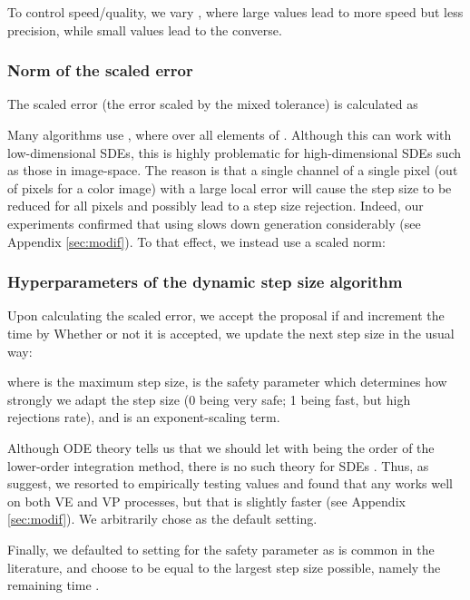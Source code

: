 \documentclass{article}
\begin{document}
To control speed/quality, we vary , where large values lead to more speed but less precision, while small values lead to the converse.

\subsubsection{Norm of the scaled error}

The scaled error (the error scaled by the mixed tolerance) is calculated as 

Many algorithms use  \citep{lamba2003adaptive, rackauckas2017adaptive}, where  over all  elements of . Although this can work with low-dimensional SDEs, this is highly problematic for high-dimensional SDEs such as those in image-space. The reason is that a single channel of a single pixel (out of  pixels for a  color image) with a large local error will cause the step size to be reduced for all pixels and possibly lead to a step size rejection. Indeed, our experiments confirmed that using  slows down generation considerably (see Appendix \ref{sec:modif}). To that effect, we instead use a scaled  norm: 


\subsubsection{Hyperparameters of the dynamic step size algorithm}

Upon calculating the scaled error, we accept the proposal  if 
and increment the time by 
Whether or not it is accepted, we update the next step size  in the usual way:

where  is the maximum step size,  is the safety parameter which determines how strongly we adapt the step size (0 being very safe; 1 being fast, but high rejections rate), and  is an exponent-scaling term.

Although ODE theory tells us that we should let  with  being the order of the lower-order integration method, there is no such theory for SDEs \citep{rackauckas2017adaptive}.
Thus, as \citet{rackauckas2017adaptive} suggest, we resorted to empirically testing values and found that any  works well on both VE and VP processes, but that  is slightly faster (see Appendix \ref{sec:modif}). We arbitrarily chose  as the default setting.

Finally, we defaulted to setting  for the safety parameter as is common in the literature, and choose  to be equal to the largest step size possible, namely the remaining time .
\end{document}
